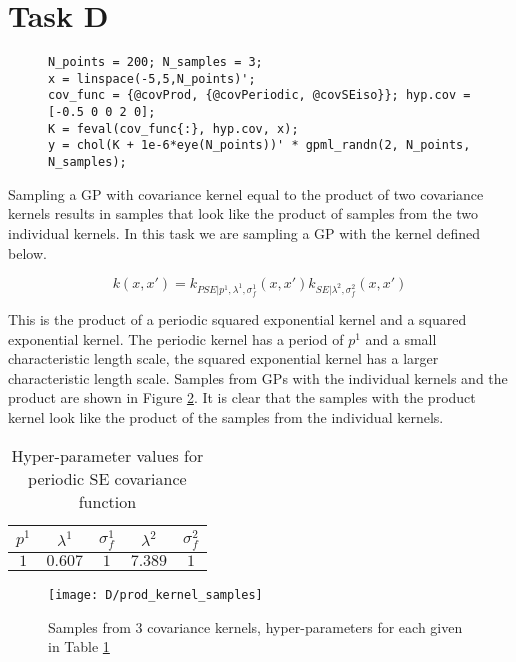 \documentclass[11pt]{article}
\begin{document}
\section{Task D}

\begin{figure}[h]
\begin{lstlisting}[caption=Code to sample a GP with covariance defined by the product of a periodic SE kernel and a SE kernel, captionpos=b, basicstyle=\small, frame=tlrb]
N_points = 200; N_samples = 3;
x = linspace(-5,5,N_points)';
cov_func = {@covProd, {@covPeriodic, @covSEiso}}; hyp.cov = [-0.5 0 0 2 0];
K = feval(cov_func{:}, hyp.cov, x);
y = chol(K + 1e-6*eye(N_points))' * gpml_randn(2, N_points, N_samples);
\end{lstlisting}
\label{lst:2D}
\end{figure}

Sampling a GP with covariance kernel equal to the product of two covariance kernels results in samples that look like the product of samples from the two individual kernels. In this task we are sampling a GP with the kernel defined below.

\[k(x, x') = k_{PSE | p^1, \lambda^1, \sigma_f^1}(x, x')k_{SE | \lambda^2, \sigma_f^2}(x, x')\]

This is the product of a periodic squared exponential kernel and a squared exponential kernel. The periodic kernel has a period of $p^1$ and a small characteristic length scale, the squared exponential kernel has a larger characteristic length scale. Samples from GPs with the individual kernels and the product are shown in Figure \ref{fig:D_prod_kernel_samples}. It is clear that the samples with the product kernel look like the product of the samples from the individual kernels.

\begin{table}[h]
    \centering
    \small
    \begin{tabular}{|c|c|c|c|c|}
        \hline
        $p^1$ & $\lambda^1$ & $\sigma_f^1$ & $\lambda^2$ & $\sigma_f^2$ \\
        \hline
        $1$ & $0.607$ & $1$ & $7.389$ & $1$ \\
        \hline
    \end{tabular}
    \caption{Hyper-parameter values for periodic SE covariance function}
    \label{table:D_product_covariance_hyper_parameters}
\end{table}

\begin{figure}[h]
    \centering
    \texttt{[image: D/prod\_kernel\_samples]}
    \caption{Samples from 3 covariance kernels, hyper-parameters for each given in Table \ref{table:D_product_covariance_hyper_parameters}}
    \label{fig:D_prod_kernel_samples}
\end{figure}
\end{document}
